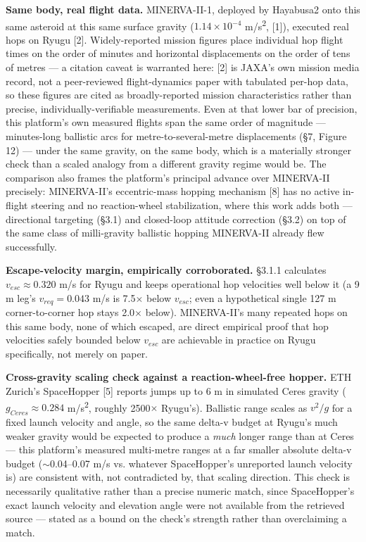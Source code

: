 \documentclass[conference]{IEEEtran}
\begin{document}
\textbf{Same body, real flight data.} MINERVA-II-1, deployed by Hayabusa2 onto this same asteroid at this same surface gravity ($1.14\times10^{-4}$ m/s\textsuperscript{2}, [1]), executed real hops on Ryugu [2]. Widely-reported mission figures place individual hop flight times on the order of minutes and horizontal displacements on the order of tens of metres --- a citation caveat is warranted here: [2] is JAXA's own mission media record, not a peer-reviewed flight-dynamics paper with tabulated per-hop data, so these figures are cited as broadly-reported mission characteristics rather than precise, individually-verifiable measurements. Even at that lower bar of precision, this platform's own measured flights span the same order of magnitude --- minutes-long ballistic arcs for metre-to-several-metre displacements (\S7, Figure 12) --- under the same gravity, on the same body, which is a materially stronger check than a scaled analogy from a different gravity regime would be. The comparison also frames the platform's principal advance over MINERVA-II precisely: MINERVA-II's eccentric-mass hopping mechanism [8] has no active in-flight steering and no reaction-wheel stabilization, where this work adds both --- directional targeting (\S3.1) and closed-loop attitude correction (\S3.2) on top of the same class of milli-gravity ballistic hopping MINERVA-II already flew successfully.

\textbf{Escape-velocity margin, empirically corroborated.} \S3.1.1 calculates $v_{esc} \approx 0.320$ m/s for Ryugu and keeps operational hop velocities well below it (a 9 m leg's $v_{req} = 0.043$ m/s is 7.5\ensuremath{\times} below $v_{esc}$; even a hypothetical single 127 m corner-to-corner hop stays 2.0\ensuremath{\times} below). MINERVA-II's many repeated hops on this same body, none of which escaped, are direct empirical proof that hop velocities safely bounded below $v_{esc}$ are achievable in practice on Ryugu specifically, not merely on paper.

\textbf{Cross-gravity scaling check against a reaction-wheel-free hopper.} ETH Zurich's SpaceHopper [5] reports jumps up to 6 m in simulated Ceres gravity ($g_{Ceres} \approx 0.284$ m/s\textsuperscript{2}, roughly 2500$\times$ Ryugu's). Ballistic range scales as $v^2/g$ for a fixed launch velocity and angle, so the same delta-v budget at Ryugu's much weaker gravity would be expected to produce a \emph{much} longer range than at Ceres --- this platform's measured multi-metre ranges at a far smaller absolute delta-v budget ($\sim$0.04--0.07 m/s vs. whatever SpaceHopper's unreported launch velocity is) are consistent with, not contradicted by, that scaling direction. This check is necessarily qualitative rather than a precise numeric match, since SpaceHopper's exact launch velocity and elevation angle were not available from the retrieved source --- stated as a bound on the check's strength rather than overclaiming a match.
\end{document}

